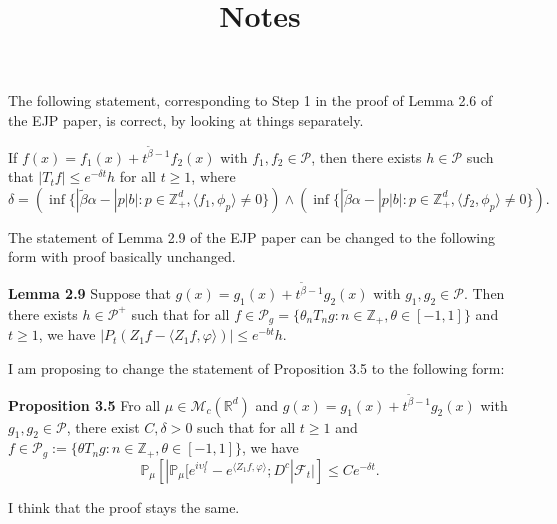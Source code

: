 \documentclass[a4paper,12pt, reqno]{amsart}
\numberwithin{equation}{section}
\begin{document}
\title[]{Notes}
\author{}


 \date{}



\maketitle





\smallskip

The following statement, corresponding to Step 1 in the proof of Lemma 2.6 of the EJP paper, is correct, by looking at things separately.

If  $f(x)=f_1(x)+t^{\widetilde{\beta}-1}f_2(x)$ with
$f_1, f_2\in\mathcal P$, then there exists $h\in \mathcal P$ such that 
$|T_tf|\le e^{-\delta t}h$ for all $t\ge 1$, where
$$
\delta=(\inf\{|\tilde \beta\alpha-|p|b|: p\in\mathbb Z^d_+, \langle f_1, \phi_p\rangle\neq 0\})
\wedge (\inf\{|\tilde \beta\alpha-|p|b|: p\in\mathbb Z^d_+, \langle f_2, \phi_p\rangle\neq 0\}).
$$


The statement of Lemma 2.9 of the EJP paper can be changed to the following form
with proof basically unchanged.

{\bf Lemma 2.9} Suppose that $g(x)=g_1(x)+t^{\tilde{\beta}-1}g_2(x)$ with
$g_1, g_2\in\mathcal P$. Then there exists $h\in\mathcal P^+$ such that for all
$f\in \mathcal P_g=\{\theta_nT_ng: n\in \mathbb Z_+, \theta\in [-1, 1]\}$ and $t\ge 1$, we have $|P_t(Z_1f-\langle Z_1f, \varphi\rangle)|\le e^{-b t}h$.



I am proposing to change the statement of Proposition 3.5 to the following form:

{\bf Proposition 3.5} Fro all $\mu\in\mathcal M_c(\mathbb R^d)$ and $g(x)=g_1(x)+t^{\tilde{\beta}-1}g_2(x)$ with
$g_1, g_2\in\mathcal P$, there exist $C, \delta>0$ such that for all $t\ge 1$ and $f\in \mathcal P_g:=\{\theta T_ng: n\in \mathbb Z_+, \theta\in [-1, 1]\}$, we have
$$
\mathbb P_\mu\left[|\mathbb P_\mu[e^{i\upsilon^f_t}-e^{\langle Z_1f, \varphi\rangle}; D^c|\mathcal F_t|\right]\le C e^{-\delta t}.
$$

I think that the proof stays the same.
\end{document}
